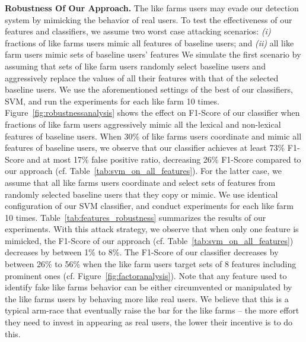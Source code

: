 \documentclass[twocolumn,10pt,letterpaper]{article}
\newcommand{\descr}[1]{\smallskip\noindent\textbf{#1}}
\begin{document}
\descr{Robustness Of Our Approach.} The like farms users may evade our detection system by mimicking the behavior of real users. To test the effectiveness of our features and classifiers, we assume two worst case attacking scenarios: \textit{(i)} fractions of like farms users mimic all features of baseline users; and \textit{(ii)} all like farm users mimic sets of baseline users' features
We simulate the first scenario by assuming that sets of like farm users randomly select baseline users and aggressively replace the values of all their features with that of the selected baseline users. We use the aforementioned settings of the best of our classifiers, SVM, and run the experiments for each like farm 10 times. Figure~\ref{fig:robustnessanalysis} shows the effect on F1-Score of our classifier when fractions of like farm users aggressively mimic all the lexical and non-lexical features of baseline users. When 30\% of like farms users coordinate and mimic all features of baseline users, we observe that our classifier achieves at least 73\% F1-Score and at most 17\% false positive ratio, decreasing 26\% F1-Score compared to our approach (cf. Table~\ref{tab:svm_on_all_features}).
%
For the latter case, we assume that all like farms users coordinate and select sets of features %
from randomly selected baseline users that they copy or mimic. We use identical configuration of our SVM classifier, and conduct experiments for each like farm 10 times. Table~\ref{tab:features_robustness} summarizes the results of our experiments. With this attack strategy, we observe that when only one feature is mimicked, %
the F1-Score of our approach (cf. Table~\ref{tab:svm_on_all_features}) decreases by between 1\% to 8\%. The F1-Score of our classifier decreases by between 26\% to 56\% when the like farm users target sets of 8 features including prominent ones (cf. Figure~\ref{fig:factoranalysis}).
Note that any feature used to identify fake like farms behavior can be either circumvented or manipulated by the like farms users by behaving more like real users. We believe that this is a typical arm-race that eventually raise the bar for the like farms -- the more effort they need to invest in appearing as real users, the lower their incentive is to do this.

\begin{figure*}[!t]
	\centering
%
\vspace{-0.15cm}
\caption{Average F1-Score and false positive ratio measured when fractions of like farms users mimic all lexical and non-lexical features (+SVM). The X-axis shows the percentage of like farms users that are mimicking baseline users.}\label{fig:robustnessanalysis}
\end{figure*}
\end{document}
